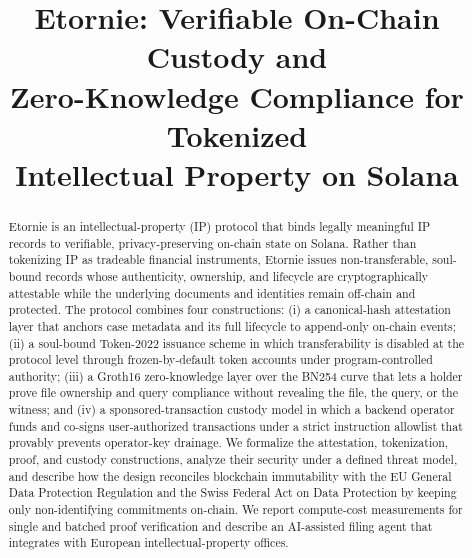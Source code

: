 \documentclass[conference]{IEEEtran}
\begin{document}
\title{Etornie: Verifiable On-Chain Custody and\\
Zero-Knowledge Compliance for Tokenized\\
Intellectual Property on Solana}

\author{
}

\maketitle

\begin{abstract}
Etornie is an intellectual-property (IP) protocol that binds legally
meaningful IP records to verifiable, privacy-preserving on-chain state on
Solana. Rather than tokenizing IP as tradeable financial instruments,
Etornie issues non-transferable, soul-bound records whose authenticity,
ownership, and lifecycle are cryptographically attestable while the
underlying documents and identities remain off-chain and protected. The
protocol combines four constructions: (i) a canonical-hash attestation layer
that anchors case metadata and its full lifecycle to append-only on-chain
events; (ii) a soul-bound Token-2022 issuance scheme in which transferability
is disabled at the protocol level through frozen-by-default token accounts
under program-controlled authority; (iii) a Groth16 zero-knowledge layer over
the BN254 curve that lets a holder prove file ownership and query compliance
without revealing the file, the query, or the witness; and (iv) a
sponsored-transaction custody model in which a backend operator funds and
co-signs user-authorized transactions under a strict instruction allowlist
that provably prevents operator-key drainage. We formalize the attestation,
tokenization, proof, and custody constructions, analyze their security under
a defined threat model, and describe how the design reconciles blockchain
immutability with the EU General Data Protection Regulation and the Swiss
Federal Act on Data Protection by keeping only non-identifying commitments
on-chain. We report compute-cost measurements for single and batched proof
verification and describe an AI-assisted filing agent that integrates with
European intellectual-property offices.
\end{abstract}
\end{document}
